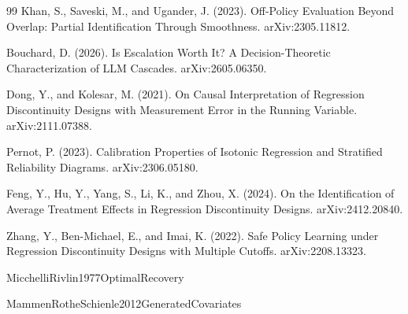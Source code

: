 \documentclass{article}
\begin{document}
\begin{thebibliography}{99}
   Khan, S., Saveski, M., and Ugander, J. (2023). Off-Policy Evaluation Beyond Overlap: Partial Identification Through Smoothness. arXiv:2305.11812.

   Bouchard, D. (2026). Is Escalation Worth It? A Decision-Theoretic Characterization of LLM Cascades. arXiv:2605.06350.

   Dong, Y., and Kolesar, M. (2021). On Causal Interpretation of Regression Discontinuity Designs with Measurement Error in the Running Variable. arXiv:2111.07388.

   Pernot, P. (2023). Calibration Properties of Isotonic Regression and Stratified Reliability Diagrams. arXiv:2306.05180.

   Feng, Y., Hu, Y., Yang, S., Li, K., and Zhou, X. (2024). On the Identification of Average Treatment Effects in Regression Discontinuity Designs. arXiv:2412.20840.

   Zhang, Y., Ben-Michael, E., and Imai, K. (2022). Safe Policy Learning under Regression Discontinuity Designs with Multiple Cutoffs. arXiv:2208.13323.

   MicchelliRivlin1977OptimalRecovery

   MammenRotheSchienle2012GeneratedCovariates

\end{thebibliography}
\end{document}
